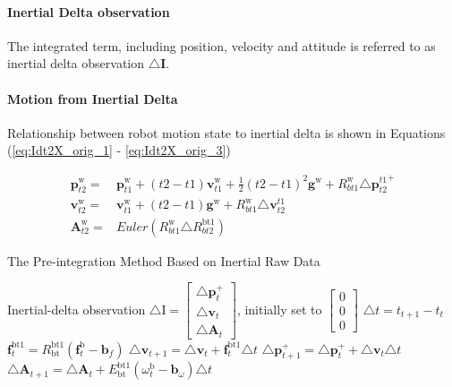 \documentclass[12pt]{article}   %
\begin{document}
\paragraph{Inertial Delta observation} The integrated term, including position, velocity and attitude is referred to as inertial delta observation $\triangle \bm{I}$.

\paragraph{Motion from Inertial Delta}
Relationship between robot motion state to inertial delta is shown in Equations (\ref{eq:Idt2X_orig_1} - \ref{eq:Idt2X_orig_3})

\begin{align}
\bm{p}^{\mathrm{w}}_{t2} = & \bm{p}^{\mathrm{w}}_{t1} + (t2 - t1) \bm{v}^{\mathrm{w}}_{t1} + 
\frac{1}{2} (t2 - t1 )^2 \bm{g}^{\mathrm{w}} + R^{\mathrm{w}}_{bt1} \triangle {\bm{p}^{t1}_{t2}}^+ 
\label{eq:Idt2X_orig_1}\\
\bm{v}^{\mathrm{w}}_{t2} = & \bm{v}^{\mathrm{w}}_{t1} + (t2 - t1 ) \bm{g}^{\mathrm{w}} + R^{\mathrm{w}}_{bt1} \triangle \bm{v}^{t1}_{t2} 
\label{eq:Idt2X_orig_2}\\
\bm{A}^{\mathrm{w}}_{t2} = & Euler( R^{\mathrm{w}}_{bt1} \triangle R^{\mathrm{bt1}}_{bt2} )
\label{eq:Idt2X_orig_3}
\end{align}

\begin{algorithm}
	\caption{The Pre-integration Method Based on Inertial Raw Data}
	\label{algm:preint}		
	\begin{algorithmic}
	\STATE Inertial-delta observation $ \triangle \bm{\mathrm{I}} = \begin{bmatrix} \triangle \textbf{p}_{t}^+ \\ \triangle \textbf{v}_{t} \\ \triangle \textbf{A} _{t} \end{bmatrix}$, initially set to $\begin{bmatrix} 0 \\ 0 \\ 0 \end{bmatrix}$
		\STATE $\triangle t =  t_{t+1} - t_t$ 
		\STATE $\textbf{f}_t^{\mathrm{bt1}} = R_{\mathrm{bt}}^{\mathrm{bt1}} (\textbf{f}_t^{\mathrm{b}} - \textbf{b}_f)$ 
		\STATE $\triangle \textbf{v}_{t+1} = \triangle \textbf{v}_{t} + \textbf{f}_t^{\mathrm{bt1}} \triangle t$ 
		\STATE $\triangle \textbf{p}_{t+1}^+ = \triangle \textbf{p}_{t}^+ + \triangle \textbf{v}_t \triangle t$ 
		\STATE $\triangle \textbf{A} _{t+1} = \triangle \textbf{A} _{t} + E_{\mathrm{bt}}^{\mathrm{bt1}} (\omega _t^{\mathrm{b}} - \textbf{b}_\omega) \triangle t$ 
		\ENDFOR
	\end{algorithmic}
\end{algorithm}
\end{document}
